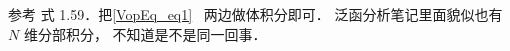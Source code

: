 
\begin{issues}
\issueDraft
\end{issues}


参考\cite{GriffE} 式 1.59．把\autoref{VopEq_eq1}~ 两边做体积分即可． 泛函分析笔记里面貌似也有 $N$ 维分部积分， 不知道是不是同一回事．
